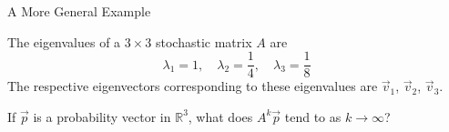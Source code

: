 \begin{frame}{A More General Example}

    The eigenvalues of a $3\times 3$ stochastic matrix $A$ are 
    $$\lambda_1 = 1 , \quad \lambda_2=\frac{1}{4}, \quad \lambda_3 = \frac 18$$
    The respective eigenvectors corresponding to these eigenvalues are $\vec v_1$, $\vec v_2$, $\vec v_3$. 
    
    \vspace{12pt}
    
    If $\vec p$ is a probability vector in $\mathbb R^3$, what does $A^k\vec p $ tend to as $k\to \infty$? 

\end{frame}







\begin{frame}
\end{frame}